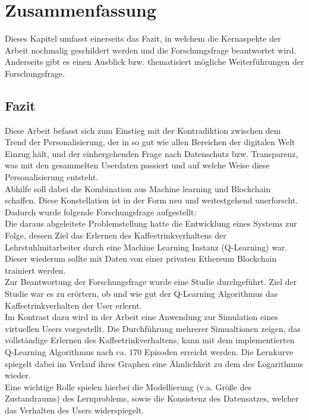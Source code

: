 \chapter{Zusammenfassung}
\label{kap:Kapitel05}
Dieses Kapitel umfasst einerseits das Fazit, in welchem die Kernaspekte der Arbeit nochmalig geschildert werden und die Forschungsfrage beantwortet wird. Anderseits gibt es einen Ausblick bzw. thematisiert mögliche Weiterführungen der Forschungsfrage. 

\section{Fazit}
\label{sec:fazit}
Diese Arbeit befasst sich zum Einstieg mit der Kontradiktion zwischen dem Trend der Personalisierung, der in so gut wie allen Bereichen der digitalen Welt Einzug hält, und der einhergehenden Frage nach Datenschutz bzw. Transparenz, was mit den gesammelten Userdaten passiert und auf welche Weise diese Personalisierung entsteht.\\
Abhilfe soll dabei die Kombination aus Machine learning und Blockchain schaffen. Diese Konstellation ist in der Form neu und weitestgehend unerforscht. Dadurch wurde folgende Forschungsfrage aufgestellt: \\ 
Die daraus abgeleitete Problemstellung hatte die Entwicklung eines Systems zur Folge, dessen Ziel das Erlernen des Kaffeetrinkverhaltens der Lehrstuhlmitarbeiter durch eine Machine Learning Instanz (Q-Learning) war. Dieser  wiederum sollte mit Daten von einer privaten Ethereum Blockchain trainiert werden. \\
Zur Beantwortung der Forschungsfrage wurde eine Studie durchgeführt.
Ziel der Studie war es zu erörtern, ob und wie gut der Q-Learning Algorithmus das Kaffeetrinkverhalten der User erlernt. \\
Im Kontrast dazu wird in der Arbeit eine Anwendung zur Simulation eines virtuellen Users vorgestellt. Die Durchführung mehrerer Simualtionen zeigen, das vollständige Erlernen des Kaffeetrinkverhaltens, kann mit dem implementierten Q-Learning Algorithmus nach ca. 170 Episoden erreicht werden. 
Die Lernkurve spiegelt dabei im Verlauf ihres Graphen eine Ähnlichkeit zu dem des Logarithmus wieder. \\
Eine wichtige Rolle spielen hierbei die Modellierung (v.a. Größe des Zustandraums) des Lernproblems, sowie die Konsistenz des Datensatzes, welcher das Verhalten des Users widerspiegelt. \\
